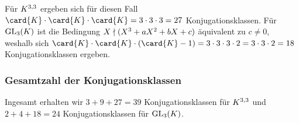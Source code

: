 Für $\matrices{3}{K}$ ergeben sich für diesen Fall $\card{K} \cdot \card{K} \cdot \card{K} = 3 \cdot 3 \cdot 3 = 27$ Konjugationsklassen.
Für $\GL{3}{K}$ ist die Bedingung $X \notdivides (X^3 + a X^2 + b X + c)$ äquivalent zu $c \neq 0$, weshalb sich $\card{K} \cdot \card{K} \cdot (\card{K} - 1) = 3 \cdot 3 \cdot 3 \cdot 2 = 3 \cdot 3 \cdot 2 = 18$ Konjugationsklassen ergeben.



\subsubsection*{Gesamtzahl der Konjugationsklassen}

Ingesamt erhalten wir $3 + 9 + 27 = 39$ Konjugationsklassen für $\matrices{3}{K}$ und $2 + 4 + 18 = 24$ Konjugationsklassen für $\GL{3}{K}$.





\subsection{}

